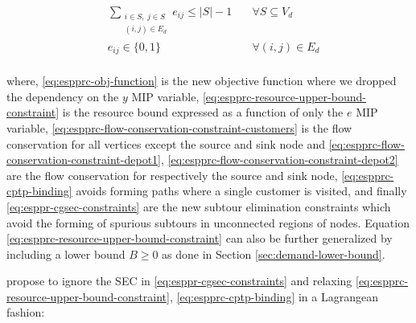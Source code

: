 \begin{align}
	                                & \sum_{\substack{i \in S,\ j \in S                                                                                                                                                          \\ (i, j) \in E_d}} e_{ij} \le |S| - 1                                                                   & \quad \forall S \subseteq V_d \label{eq:esppr-cgsec-constraints} \\
	                                & e_{ij}                   \in \lbrace 0, 1 \rbrace                                                          & \quad \forall (i, j) \in E_d               \label{eq:espprc-e-mip-var-bounds} \\
\end{align}

where, \eqref{eq:espprc-obj-function} is the new objective function where we dropped the dependency on the $y$ MIP variable,
\eqref{eq:espprc-resource-upper-bound-constraint} is the resource bound expressed as a function of only the $e$ MIP variable,
\eqref{eq:espprc-flow-conservation-constraint-customers} is the flow conservation for all vertices except the source and sink node
and \eqref{eq:espprc-flow-conservation-constraint-depot1}, \eqref{eq:espprc-flow-conservation-constraint-depot2} are the flow conservation for respectively the source and sink node,
\eqref{eq:espprc-cptp-binding} avoids forming paths where a single customer is visited,
and finally \eqref{eq:esppr-cgsec-constraints} are the new subtour elimination constraints which avoid the forming of spurious subtours in unconnected regions of nodes.
Equation \eqref{eq:espprc-resource-upper-bound-constraint} can also be further generalized by including a lower bound $B \ge 0$ as done in Section \ref{sec:demand-lower-bound}.

\cite{beasley1989algorithm} propose to ignore the SEC in \eqref{eq:esppr-cgsec-constraints} and relaxing \eqref{eq:espprc-resource-upper-bound-constraint}, \eqref{eq:espprc-cptp-binding} in a Lagrangean fashion:

